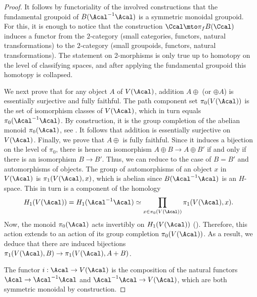 \begin{proof}
It follows by functoriality of the involved constructions that the fundamental groupoid of $B(\Acal^{-1} \Acal)$ is a symmetric monoidal groupoid. For this, it is enough to notice that the construction $\Ccal\mto \pi_{f}B(\Ccal)$ induces a functor from the $2$-category (small categories, functors, natural transformations) to the $2$-category (small groupoids, functors, natural transformations). The statement on 2-morphisms is only true up to homotopy on the level of classifying spaces, and after applying the fundamental groupoid this homotopy is collapsed.

We next prove that for any object $A$ of $V(\Acal)$, addition $A \oplus$ (or $\oplus A$) is essentially surjective and fully faithful. The path component set $\pi_0(V(\Acal))$ is the set of isomorphism classes of $V(\Acal)$, which in turn equals $\pi_{0}(\Acal^{-1}\Acal)$. By construction, it is the group completion of the abelian monoid $\pi_0(\Acal)$, see \cite[Lem.\,13.3.4]{Richter}. It follows that addition is essentially surjective on $V(\Acal)$. Finally, we prove that $A \oplus$ is fully faithful. Since it induces a bijection on the level of $\pi_0$, there is hence an isomorphism $A \oplus B \to A \oplus B'$ if and only if there is an isomorphism $B \to B'$. Thus, we can reduce to the case of $B = B'$ and automorphisms of objects. The group of automorphisms of an object $x$ in $V(\Acal)$ is $\pi_1(V(\Acal), x)$, which is abelian since $B(\Acal^{-1} \Acal)$ is an $H$-space. This in turn is a component of the homology
\begin{displaymath}
H_{1}(V(\Acal))=H_{1}(\Acal^{-1}\Acal)\simeq\prod_{x\in\pi_{0}(V(\Acal))}\pi_{1}(V(\Acal),x).
\end{displaymath}
Now, the monoid $\pi_{0}(\Acal)$ acts invertibly on $H_{1}(V(\Acal))$ (\cf \cite[p.\,221]{Grayson}). Therefore, this action extends to an action of its group completion $\pi_0(V(\Acal))$. As a result, we deduce that there are induced bijections $\pi_1(V(\Acal), B) \to \pi_1(V(\Acal), A+B)$.

The functor $i: \Acal \to V(\Acal)$ is the composition of the natural functors $\Acal \to \Acal^{-1}\Acal$ and $\Acal^{-1}\Acal\to V(\Acal)$, which are both symmetric monoidal by construction.


\end{proof}
